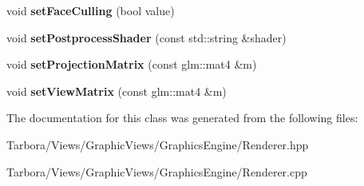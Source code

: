 \begin{DoxyCompactItemize}
void {\bfseries set\+Face\+Culling} (bool value)
\item 
\mbox{\label{classTarbora_1_1Renderer_acfd82fbd8d6f3122c40f62e7d6af5aa6}} 
void {\bfseries set\+Postprocess\+Shader} (const std\+::string \&shader)
\item 
\mbox{\label{classTarbora_1_1Renderer_a7ee6cbe4d810fabc69afddf5aa018ea5}} 
void {\bfseries set\+Projection\+Matrix} (const glm\+::mat4 \&m)
\item 
\mbox{\label{classTarbora_1_1Renderer_a52ef995206977fa5d8fd955bc7698850}} 
void {\bfseries set\+View\+Matrix} (const glm\+::mat4 \&m)
\end{DoxyCompactItemize}


The documentation for this class was generated from the following files\+:\begin{DoxyCompactItemize}
\item 
Tarbora/\+Views/\+Graphic\+Views/\+Graphics\+Engine/Renderer.\+hpp\item 
Tarbora/\+Views/\+Graphic\+Views/\+Graphics\+Engine/Renderer.\+cpp\end{DoxyCompactItemize}
